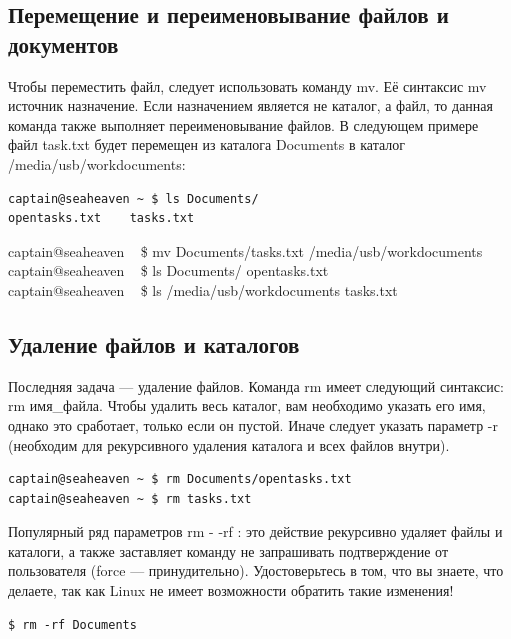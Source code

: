\documentclass[10pt]{book}
\begin{document}
\subsection{Перемещение и переименовывание файлов и документов}
Чтобы переместить файл, следует использовать команду mv. Её синтаксис mv источник назначение. Если назначением является не каталог, а файл, то данная команда также выполняет переименовывание файлов. В следующем примере файл task.txt будет перемещен из каталога Documents в каталог /media/usb/workdocuments:

\vspace{3mm}
\begin{tcolorbox}
\begin{lstlisting}
captain@seaheaven ~ $ ls Documents/
opentasks.txt	 tasks.txt
\end{lstlisting}
captain@seaheaven ~ \$ mv Documents/tasks.txt /media/usb/workdocuments \\
captain@seaheaven ~ \$ ls Documents/
opentasks.txt \\
captain@seaheaven ~ \$ ls /media/usb/workdocuments
tasks.txt
\end{tcolorbox}

\subsection{Удаление файлов и каталогов}

Последняя задача — удаление файлов. Команда rm имеет следующий синтаксис: rm имя\_файла. Чтобы удалить весь каталог, вам необходимо указать его имя, однако это сработает, только если он пустой. Иначе следует указать параметр -r  (необходим для рекурсивного удаления каталога и всех файлов внутри).

\vspace{3mm}
\begin{tcolorbox}
\begin{lstlisting}
captain@seaheaven ~ $ rm Documents/opentasks.txt
captain@seaheaven ~ $ rm tasks.txt
\end{lstlisting}
\end{tcolorbox}

Популярный ряд параметров rm - -rf : это действие рекурсивно удаляет файлы и каталоги, а также заставляет команду не запрашивать подтверждение от пользователя (force — принудительно). Удостоверьтесь в том, что вы знаете, что делаете, так как Linux не имеет возможности обратить такие изменения! 

\vspace{3mm}
\begin{tcolorbox}
\begin{lstlisting}
$ rm -rf Documents
\end{lstlisting}
\end{tcolorbox}
\end{document}
